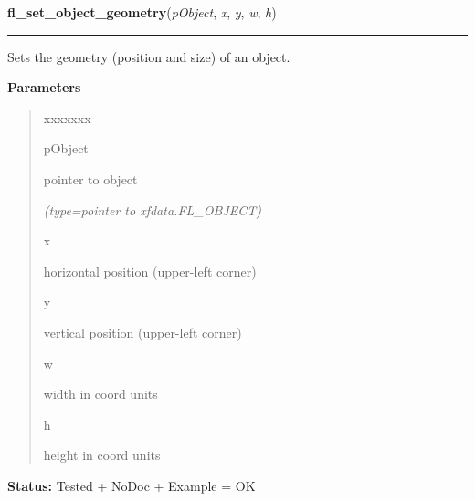 \hspace{.8\funcindent}\begin{boxedminipage}{\funcwidth}

    \raggedright \textbf{fl\_set\_object\_geometry}(\textit{pObject}, \textit{x}, \textit{y}, \textit{w}, \textit{h})

    \vspace{-1.5ex}

    \rule{\textwidth}{0.5\fboxrule}
\setlength{\parskip}{2ex}
    Sets the geometry (position and size) of an object.

\setlength{\parskip}{1ex}
      \textbf{Parameters}
      \vspace{-1ex}

      \begin{quote}
        \begin{Ventry}{xxxxxxx}

          \item[pObject]

          pointer to object

            {\it (type=pointer to xfdata.FL\_OBJECT)}

          \item[x]

          horizontal position (upper-left corner)

          \item[y]

          vertical position (upper-left corner)

          \item[w]

          width in coord units

          \item[h]

          height in coord units

        \end{Ventry}

      \end{quote}

\textbf{Status:} Tested + NoDoc + Example = OK



    \end{boxedminipage}

    \label{xformslib:library:fl_move_object}

    \vspace{0.5ex}

